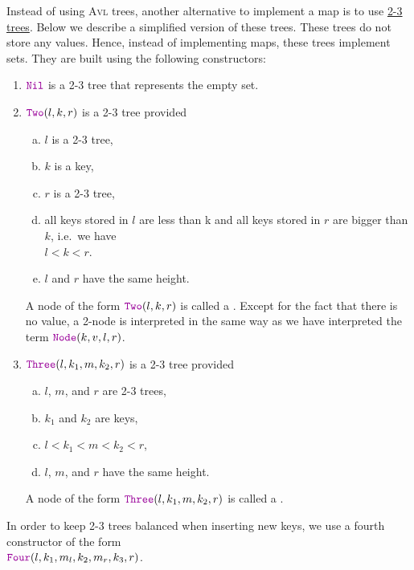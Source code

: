 \exercise
Instead of using \textsc{Avl} trees, another alternative to implement a map is to use 
\href{https://en.wikipedia.org/wiki/2-3_tree}{2-3 trees}.  
Below we describe a simplified version of these trees.  These trees do not store any values.  Hence, instead
of implementing maps, these trees implement sets. They are built using the following constructors:
\begin{enumerate}
\item $\mytt{Nil}$ is a 2-3 tree that represents the empty set.
\item $\mytt{Two}(l, k, r)$ is a 2-3 tree provided
      \begin{enumerate}[(a)]
      \item $l$ is a 2-3 tree,
      \item $k$ is a key,
      \item $r$ is a 2-3 tree,
      \item all keys stored in $l$ are less than k and all keys stored in $r$ are bigger than $k$,
            i.e.~we have
            \\[0.2cm]
            \hspace*{1.3cm}
            $l < k < r$.
      \item $l$ and $r$ have the same height.
      \end{enumerate}
      A node of the form  $\mytt{Two}(l, k, r)$ is called a .  Except for the fact
      that there is no value, a 2-node is
      interpreted in the same way as we have interpreted the term $\mytt{Node}(k, v, l, r)$.
\item $\mytt{Three}(l, k_1, m, k_2, r)$ is a 2-3 tree provided
      \begin{enumerate}[(a)]
      \item $l$, $m$, and $r$ are 2-3 trees,
      \item $k_1$ and $k_2$ are keys,
      \item $l < k_1 < m < k_2 < r$,
      \item $l$, $m$, and $r$ have the same height.
      \end{enumerate}
      A node of the form  $\mytt{Three}(l, k_1, m, k_2, r)$ is called a .
\end{enumerate}
In order to keep 2-3 trees balanced when inserting new keys, we use a fourth constructor of the form
\\[0.2cm]
\hspace*{1.3cm}
$\mytt{Four}(l,k_1,m_l, k_2, m_r, k_3, r)$.
\\[0.2cm]
